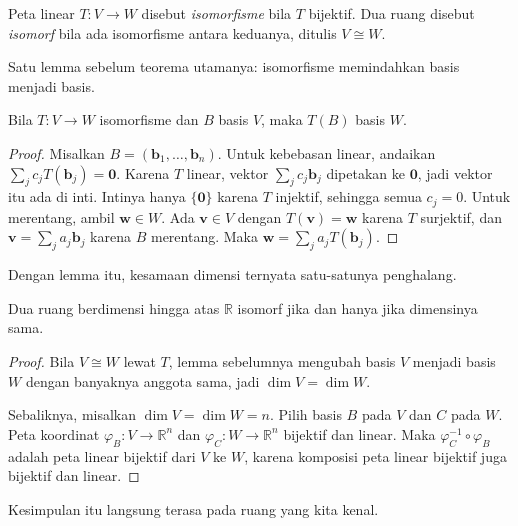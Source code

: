 
\begin{definisi}[Isomorfisme]
Peta linear $T\colon V\to W$ disebut \emph{isomorfisme} bila $T$ bijektif. Dua ruang disebut
\emph{isomorf} bila ada isomorfisme antara keduanya, ditulis $V\cong W$.
\end{definisi}

Satu lemma sebelum teorema utamanya: isomorfisme memindahkan basis menjadi basis.

\begin{lemma}
Bila $T\colon V\to W$ isomorfisme dan $B$ basis $V$, maka $T(B)$ basis $W$.
\end{lemma}

\begin{proof}
Misalkan $B=(\mathbf{b}_{1},\dots,\mathbf{b}_{n})$. Untuk kebebasan linear, andaikan
$\sum_{j}c_{j}T(\mathbf{b}_{j})=\mathbf{0}$. Karena $T$ linear, vektor
$\sum_{j}c_{j}\mathbf{b}_{j}$ dipetakan ke $\mathbf{0}$, jadi vektor itu ada di inti.
Intinya
hanya $\{\mathbf{0}\}$ karena $T$ injektif, sehingga semua $c_{j}=0$.
Untuk merentang, ambil $\mathbf{w}\in W$. Ada $\mathbf{v}\in V$ dengan $T(\mathbf{v})=\mathbf{w}$
karena $T$ surjektif, dan $\mathbf{v}=\sum_{j}a_{j}\mathbf{b}_{j}$ karena $B$ merentang.
Maka
$\mathbf{w}=\sum_{j}a_{j}T(\mathbf{b}_{j})$.
\end{proof}

Dengan lemma itu, kesamaan dimensi ternyata satu-satunya penghalang.

\begin{teorema}
Dua ruang berdimensi hingga atas $\mathbb{R}$ isomorf jika dan hanya jika dimensinya sama.
\end{teorema}

\begin{proof}
Bila $V\cong W$ lewat $T$, lemma sebelumnya mengubah basis $V$ menjadi basis $W$ dengan
banyaknya anggota sama, jadi $\dim V=\dim W$.

Sebaliknya, misalkan $\dim V=\dim W=n$. Pilih basis $B$ pada $V$ dan $C$ pada $W$. Peta
koordinat $\varphi_{B}\colon V\to\mathbb{R}^{n}$ dan $\varphi_{C}\colon W\to\mathbb{R}^{n}$
bijektif dan linear. Maka $\varphi_{C}^{-1}\circ\varphi_{B}$ adalah peta linear bijektif
dari
$V$ ke $W$, karena komposisi peta linear bijektif juga bijektif dan linear.
\end{proof}

Kesimpulan itu langsung terasa pada ruang yang kita kenal.

